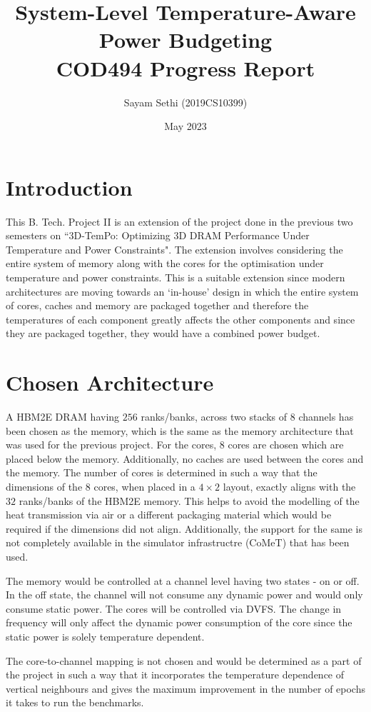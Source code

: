 \documentclass[11pt]{article}
\title{System-Level Temperature-Aware Power Budgeting\\COD494 Progress Report}
\author{Sayam Sethi (2019CS10399)}
\date{May 2023}
\begin{document}
\maketitle

\tableofcontents

\section{Introduction}
This B. Tech. Project II is an extension of the project done in the previous two semesters on ``3D-TemPo: Optimizing 3D DRAM Performance Under Temperature and Power Constraints". The extension involves considering the entire system of memory along with the cores for the optimisation under temperature and power constraints. This is a suitable extension since modern architectures are moving towards an `in-house' design in which the entire system of cores, caches and memory are packaged together and therefore the temperatures of each component greatly affects the other components and since they are packaged together, they would have a combined power budget.

\section{Chosen Architecture}
A HBM2E DRAM having $256$ ranks/banks, across two stacks of $8$ channels has been chosen as the memory, which is the same as the memory architecture that was used for the previous project. For the cores, $8$ cores are chosen which are placed below the memory. Additionally, no caches are used between the cores and the memory. The number of cores is determined in such a way that the dimensions of the $8$ cores, when placed in a $4\times 2$ layout, exactly aligns with the $32$ ranks/banks of the HBM2E memory. This helps to avoid the modelling of the heat transmission via air or a different packaging material which would be required if the dimensions did not align. Additionally, the support for the same is not completely available in the simulator infrastructre (CoMeT) that has been used.\par
The memory would be controlled at a channel level having two states - on or off. In the off state, the channel will not consume any dynamic power and would only consume static power. The cores will be controlled via DVFS. The change in frequency will only affect the dynamic power consumption of the core since the static power is solely temperature dependent.\par
The core-to-channel mapping is not chosen and would be determined as a part of the project in such a way that it incorporates the temperature dependence of vertical neighbours and gives the maximum improvement in the number of epochs it takes to run the benchmarks.
\end{document}
